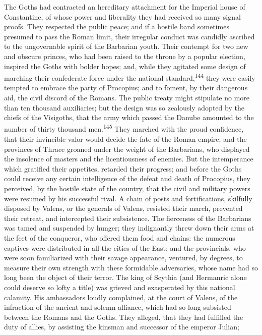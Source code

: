 {{{{{{{{{{{{{{{{{{{{{{{{{{{{{{{{{{{{{{{{{{{{{{{{{{{{{{{{{{{{{{{{{{{{{{{{{{{{{{{{{{{{{{{{{{{{{{{{{{{{{{{{{{{{{{{{{{{{{{{{{{{{{{{{{{{{{{{{{{{{{{{{{{{{{{{{{{{{{{{{{{The Goths had contracted an hereditary attachment for the
Imperial house of Constantine, of whose power and liberality they
had received so many signal proofs. They respected the public
peace; and if a hostile band sometimes presumed to pass the Roman
limit, their irregular conduct was candidly ascribed to the
ungovernable spirit of the Barbarian youth. Their contempt for
two new and obscure princes, who had been raised to the throne by
a popular election, inspired the Goths with bolder hopes; and,
while they agitated some design of marching their confederate
force under the national standard,\textsuperscript{144} they were easily tempted
to embrace the party of Procopius; and to foment, by their
dangerous aid, the civil discord of the Romans. The public treaty
might stipulate no more than ten thousand auxiliaries; but the
design was so zealously adopted by the chiefs of the Visigoths,
that the army which passed the Danube amounted to the number of
thirty thousand men.\textsuperscript{145} They marched with the proud confidence,
that their invincible valor would decide the fate of the Roman
empire; and the provinces of Thrace groaned under the weight of
the Barbarians, who displayed the insolence of masters and the
licentiousness of enemies. But the intemperance which gratified
their appetites, retarded their progress; and before the Goths
could receive any certain intelligence of the defeat and death of
Procopius, they perceived, by the hostile state of the country,
that the civil and military powers were resumed by his successful
rival. A chain of posts and fortifications, skilfully disposed by
Valens, or the generals of Valens, resisted their march,
prevented their retreat, and intercepted their subsistence. The
fierceness of the Barbarians was tamed and suspended by hunger;
they indignantly threw down their arms at the feet of the
conqueror, who offered them food and chains: the numerous
captives were distributed in all the cities of the East; and the
provincials, who were soon familiarized with their savage
appearance, ventured, by degrees, to measure their own strength
with these formidable adversaries, whose name had so long been
the object of their terror. The king of Scythia (and Hermanric
alone could deserve so lofty a title) was grieved and exasperated
by this national calamity. His ambassadors loudly complained, at
the court of Valens, of the infraction of the ancient and solemn
alliance, which had so long subsisted between the Romans and the
Goths. They alleged, that they had fulfilled the duty of allies,
by assisting the kinsman and successor of the emperor Julian;
}}}}}}}}}}}}}}}}}}}}}}}}}}}}}}}}}}}}}}}}}}}}}}}}}}}}}}}}}}}}}}}}}}}}}}}}}}}}}}}}}}}}}}}}}}}}}}}}}}}}}}}}}}}}}}}}}}}}}}}}}}}}}}}}}}}}}}}}}}}}}}}}}}}}}}}}}}}}}}}}}}
